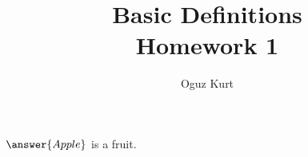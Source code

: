 \documentclass{ximera}
\title{Basic Definitions \\ Homework 1}
\author{Oguz Kurt}
\begin{document}
\maketitle
 
\begin{problem}
$\answer{Apple}$ is a fruit.
\end{problem}
\end{document}
